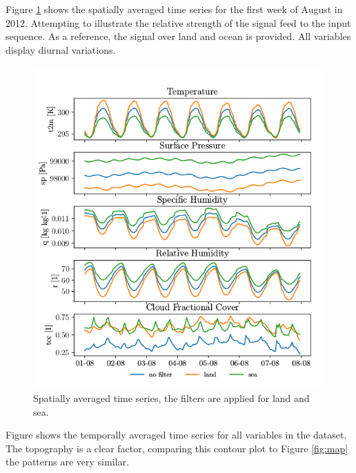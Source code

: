 Figure \ref{fig:random_week} shows the spatially averaged time series for the first week of August in 2012. Attempting to illustrate the relative strength of the signal feed to the input sequence. As a reference, the signal over land and ocean is provided. All variables display diurnal variations.
\begin{figure}[ht]
    \centering
    \includegraphics{python_figs/spatially_averaged_one_week_from_2012-08-01.png}
    \caption{Spatially averaged time series, the filters are applied for land and sea.}
    \label{fig:random_week}
\end{figure}
Figure %
shows the temporally averaged time series for all variables in the dataset. The topography is a clear factor, comparing this contour plot to Figure \ref{fig:map} the patterns are very similar. 


